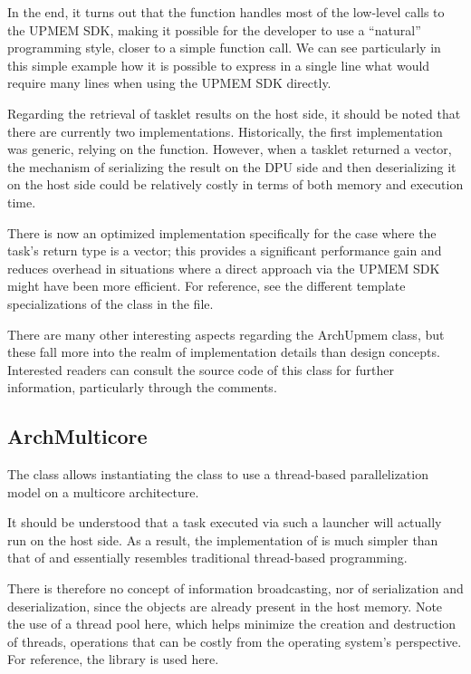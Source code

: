 In the end, it turns out that the  function handles most of the low-level calls to the UPMEM SDK, 
making it possible for the developer to use a “natural” programming style, closer to a simple function call.
We can see particularly in this simple example how it is possible to express in a single line what would require 
many lines when using the UPMEM SDK directly.

Regarding the retrieval of tasklet results on the host side, it should be noted that there are currently two implementations.
Historically, the first implementation was generic, relying on the  function. 
However, when a tasklet returned a vector, the mechanism of serializing the result on the DPU side and then deserializing 
it on the host side could be relatively costly in terms of both memory and execution time.

There is now an optimized implementation specifically for the case where the task's return type is a vector; 
this provides a significant performance gain and reduces \BPL overhead in situations where a direct approach via the 
UPMEM SDK might have been more efficient. For reference, see the different template specializations of the 
 class in the  file.

There are many other interesting aspects regarding the ArchUpmem class, but these fall more into the realm of
 implementation details than design concepts. Interested readers can consult the source code of this class
  for further information, particularly through the comments.

\subsection{ArchMulticore}

The  class allows instantiating the  class to use a thread-based parallelization model 
on a multicore architecture.

It should be understood that a task executed via such a launcher will actually run on the host side. 
As a result, the implementation of  is much simpler than that of 
 and essentially resembles traditional thread-based programming.

There is therefore no concept of information broadcasting, nor of serialization and deserialization, 
since the objects are already present in the host memory. 
Note the use of a thread pool here, which helps minimize the creation and destruction of threads, 
operations that can be costly from the operating system's perspective. 
For reference, the  library is used here.

